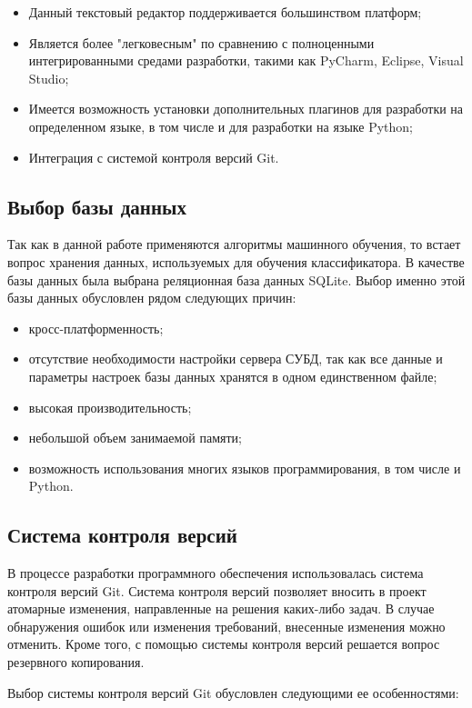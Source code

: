 \begin{itemize}
	\item Данный текстовый редактор поддерживается большинством платформ;
	\item Является более "легковесным" по сравнению с полноценными интегрированными средами разработки, такими как PyCharm, Eclipse, Visual Studio;
	\item Имеется возможность установки дополнительных плагинов для разработки на определенном языке, в том числе и для разработки на языке Python;
	\item Интеграция с системой контроля версий Git.
\end{itemize} 

\subsection{Выбор базы данных}
Так как в данной работе применяются алгоритмы машинного обучения, то встает вопрос хранения данных, используемых для обучения классификатора.
В качестве базы данных была выбрана реляционная база данных SQLite. Выбор именно этой базы данных обусловлен рядом следующих причин:

\begin{itemize}
	\item кросс-платформенность;
	\item отсутствие необходимости настройки сервера СУБД, так как все данные и параметры настроек базы данных хранятся в одном единственном файле;
	\item высокая производительность;
	\item небольшой объем занимаемой памяти;
	\item возможность использования многих языков программирования, в том числе и Python.
\end{itemize}

\subsection{Система контроля версий}
В процессе разработки программного обеспечения использовалась система контроля версий Git. Система контроля версий позволяет вносить в проект атомарные изменения, направленные на решения каких-либо задач. В случае обнаружения ошибок или изменения требований, внесенные изменения можно отменить. Кроме того, с помощью системы контроля версий решается вопрос резервного копирования.

Выбор системы контроля версий Git обусловлен следующими ее особенностями:

